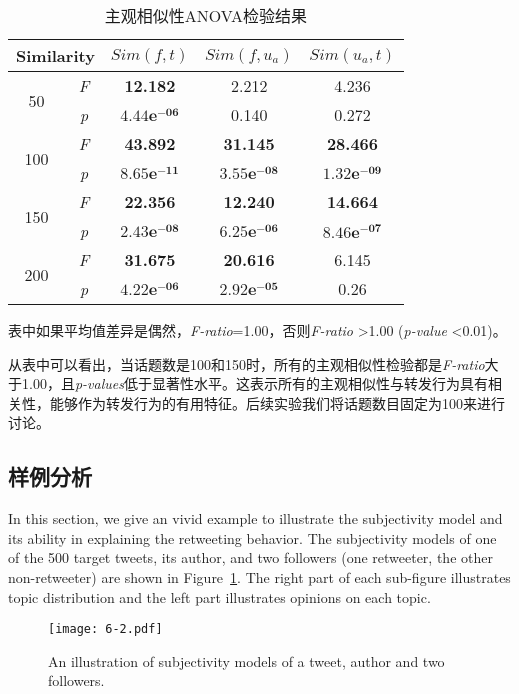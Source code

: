 \begin{table}[htb]
\scriptsize
\centering
\caption{主观相似性ANOVA检验结果} 
\label{tab6-3}
\begin{tabular}{|c|c|c|c|c|}
\hline
\multicolumn{2}{|c|}{Similarity}& $ Sim(f,t) $ & $ Sim(f,u_a)  $ & $ Sim(u_a,t)  $\\
\hline
\multirow{2}{*}{50} & \textit{F} & \textbf{12.182} & 2.212 & 4.236 \\
\cline{2-5}
  & \textit{p} &  $\mathbf{4.44e^{-06}}$  & 0.140 & 0.272\\
\hline
\multirow{2}{*}{100} & \textit{F} & \textbf{43.892} & \textbf{31.145} & \textbf{28.466} \\
\cline{2-5}
  & \textit{p} &  $\mathbf{8.65e^{-11}}$  & $\mathbf{3.55e^{-08}}$ & $\mathbf{1.32e^{-09}}$\\
\hline
\multirow{2}{*}{150} & \textit{F} & \textbf{22.356} & \textbf{12.240} & \textbf{14.664} \\
\cline{2-5}
  & \textit{p} &  $\mathbf{2.43e^{-08}}$  & $\mathbf{6.25e^{-06}}$ & $\mathbf{8.46e^{-07}}$\\
\hline
\multirow{2}{*}{200} & \textit{F} & \textbf{31.675} & \textbf{20.616} & 6.145\\
\cline{2-5}
  & \textit{p} &  $\mathbf{4.22e^{-06}}$  & $\mathbf{2.92e^{-05}}$ & 0.26\\
\hline
\end{tabular}
\begin{tablenotes}
\footnotesize
表中如果平均值差异是偶然，\textit{F-ratio}=1.00，否则\textit{F-ratio} \textgreater 1.00 (\textit{p-value} \textless 0.01)。
\end{tablenotes}
\end{table}
从表中可以看出，当话题数是100和150时，所有的主观相似性检验都是\textit{F-ratio}大于1.00，且\textit{p-values}低于显著性水平。这表示所有的主观相似性与转发行为具有相关性，能够作为转发行为的有用特征。后续实验我们将话题数目固定为100来进行讨论。

\subsection{样例分析}
\label{example}

In this section, we give an vivid example to illustrate the subjectivity model and its ability in explaining the retweeting behavior. 
The subjectivity models of one of the 500 target tweets, its author, and two followers (one retweeter, the other non-retweeter) are shown in Figure~\ref{fig5}. 
The right part of each sub-figure illustrates topic distribution and the left part illustrates opinions on each topic. 
\begin{figure}[htb]
\centering
\texttt{[image: 6-2.pdf]}
\caption{An illustration of subjectivity models of a tweet, author and two followers.}
\label{fig5}
\end{figure}

